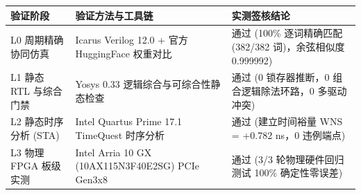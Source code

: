 \documentclass[11pt,a4paper]{article}
\begin{document}
{\footnotesize\renewcommand{\arraystretch}{1.14}\begin{longtable}{@{}L{0.24\textwidth}L{0.34\textwidth}L{0.34\textwidth}@{}}\toprule

\textbf{验证阶段} & \textbf{验证方法与工具链} & \textbf{实测签核结论}\\\midrule\endhead

L0 周期精确协同仿真 & Icarus Verilog 12.0 +\allowbreak{} 官方 HuggingFace 权重对比 & 通过 (\allowbreak{}100\% 逐词精确匹配 (\allowbreak{}382/\allowbreak{}382 词)\allowbreak{}，余弦相似度 0.999992)\allowbreak{}\\[2pt]

L1 静态 RTL 与综合门禁 & Yosys 0.33 逻辑综合与可综合性静态检查 & 通过 (\allowbreak{}0 锁存器推断，0 组合逻辑除法环路，0 多驱动冲突)\allowbreak{}\\[2pt]

L2 静态时序分析 (\allowbreak{}STA)\allowbreak{} & Intel Quartus Prime 17.1 TimeQuest 时序分析 & 通过 (\allowbreak{}建立时间裕量 WNS =\allowbreak{} +\allowbreak{}0.782 ns，0 违例端点)\allowbreak{}\\[2pt]

L3 物理 FPGA 板级实测 & Intel Arria 10 GX (\allowbreak{}10AX115N\allowbreak{}3F40E2SG)\allowbreak{} PCIe Gen3x8 & 通过 (\allowbreak{}3/\allowbreak{}3 轮物理硬件回归测试 100\% 确定性零误差)\allowbreak{}\\[2pt]

\bottomrule\end{longtable}}
\end{document}
